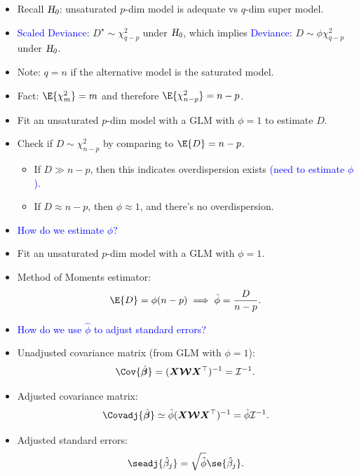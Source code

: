 \documentclass[oneside]{book}\usepackage[]{graphicx}\usepackage[svgnames]{xcolor}
\newcommand{\HN}{\textsl{H}_{\textsl{0}}}%
\providecommand{\Vector}[1]{\bm{#1}}%
\providecommand{\Matrix}[1]{\bm{#1}}
\providecommand{\MatrixCal}[1]{\bm{\mathcal{#1}}}
\begin{document}
\begin{itemize}
      \item Recall $ \HN $: unsaturated $ p $-dim model is adequate vs $ q $-dim super model.
      \item \textcolor{Blue}{Scaled Deviance}: $ D^\star \sim \chi^2_{q-p} $ under $ \HN $, which implies \textcolor{Blue}{Deviance}: $ D \sim \phi\chi^2_{q-p} $ under $ \HN $.
      \item Note: $ q=n $ if the alternative model is the saturated model.
      \item Fact: $ \E{\chi^2_{m}}=m $ and therefore $ \E{\chi^2_{n-p}}=n-p $.
      \item Fit an unsaturated $ p $-dim model with a GLM with $ \phi=1 $ to estimate $ D $.
      \item Check if $ D \sim \chi^2_{n-p} $ by comparing to $ \E{D}=n-p $.
            \begin{itemize}
                  \item If $ D\gg n-p $, then this indicates overdispersion exists \textcolor{Blue}{(need to estimate $ \phi $)}.
                  \item If $ D \approx n-p $, then $ \phi\approx 1 $, and there's no overdispersion.
            \end{itemize}
      \item \textcolor{Blue}{How do we estimate $ \phi $?}
      \item Fit an unsaturated $ p $-dim model with a GLM with $ \phi=1 $.
      \item Method of Moments estimator:
            \[ \E{D}=\phi(n-p)\implies \hat{\phi}=\frac{D}{n-p}. \]
      \item \textcolor{Blue}{How do we use $ \hat{\phi} $ to adjust standard errors?}
      \item Unadjusted covariance matrix (from GLM with $ \phi=1 $):
            \[ \Cov{\hat{\Vector{\beta}}}=(\Matrix{X}\MatrixCal{W}\Matrix{X}^\top)^{-1}=\mathcal{I}^{-1}. \]
      \item Adjusted covariance matrix:
            \[ \Covadj{\hat{\Vector{\beta}}}\simeq \hat{\phi} (\Matrix{X}\MatrixCal{W}\Matrix{X}^\top)^{-1}=\hat{\phi}\mathcal{I}^{-1}. \]
      \item Adjusted standard errors:
            \[ \seadj{\hat{\beta}_j}=\sqrt{\hat{\phi}}\se{\hat{\beta}_j}. \]
\end{itemize}
\end{document}
